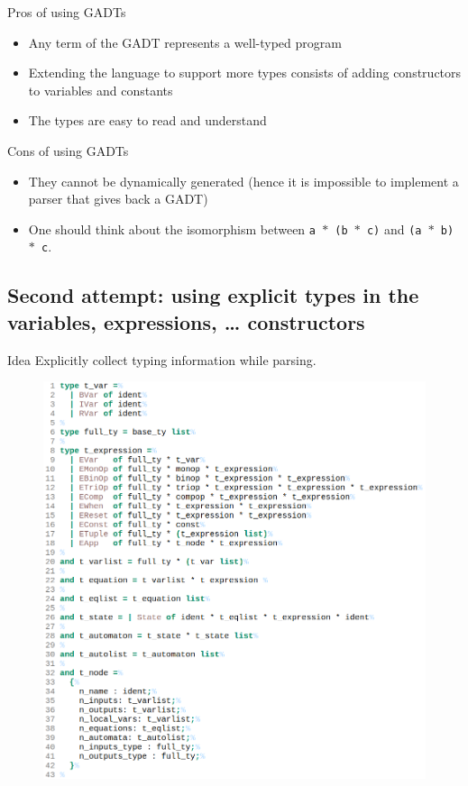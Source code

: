 \documentclass{beamer}
\begin{document}
\begin{frame}
	\begin{block}{Pros of using GADTs}
		\begin{itemize}
			\item Any term of the GADT represents a well-typed program
			\item Extending the language to support more types consists of adding
				constructors to variables and constants
			\item The types are easy to read and understand
		\end{itemize}
	\end {block}

	\begin{block}{Cons of using GADTs}
		\begin{itemize}
			\item
			They cannot be dynamically generated (hence it is impossible to
			implement a parser that gives back a GADT)
			\item
			One should think about the isomorphism between
			\texttt{a $\ast$ (b $\ast$ c)} and \texttt{(a $\ast$ b) $\ast$ c}.
		\end{itemize}
	\end{block}
\end{frame}

\subsection{Second attempt: using explicit types in the variables, expressions,
\dots{} constructors}
\begin{frame}
	\begin{block}{Idea}
		Explicitly collect typing information while parsing.
	\end{block}
	\begin{figure}
		\centering
		\includegraphics[width=.6\textwidth]{imgs/explicit_types.png}
	\end{figure}
\end{frame}
\end{document}
